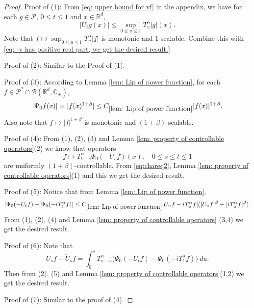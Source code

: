 \documentclass[12pt,oneside,english]{amsart}
\theoremstyle{plain}
\theoremstyle{definition}
\numberwithin{equation}{section}
\begin{document}
\begin{proof}
    Proof of (1): From \eqref{eq: upper bound for vf} in the appendix, we have for each $g\in \mathcal P$, $0\leq t\leq 1$ and $x\in \mathbb R^d$,
\[
    |U_t g(x)|
    \leq \sup_{0\leq u\leq 1}T_u^\alpha |g| (x).
\]
    Note that $f\mapsto\sup_{0\leq u\leq 1}T^{\alpha}_u|f|$ is monotonic and $1$-scalable.
    Combine this with \eqref{eq: -v has positive real part, we get the desired result.}

    Proof of (2): Similar to the Proof of (1).

    Proof of (3): According to Lemma \ref{lem: Lip of power function}, for each $f\in \mathcal P^* \cap \mathcal B(\mathbb R^d, \mathbb C_+)$,
\[
    |\Psi_0 f(x)| = |f(x)^{1+\beta}| \leq C_{\ref{lem: Lip of power function}} |f(x)|^{1+\beta}.
\]
    Also note that $f\mapsto |f|^{1+\beta}$ is monotonic and $(1+\beta)$-scalable.

    Proof of (4): From (1), (2), (3) and Lemma \ref{lem: property of controllable operators}(2) we know that operators
\[
    f
    \mapsto T^{\alpha}_{t-s}\Psi_0(-U_sf)(x),
    \quad 0\leq s\leq t\leq 1
\]
    are uniformly $(1+\beta)$-controllable.
    From \eqref{eq:chareq2}, Lemma \ref{lem: property of controllable operators}(1) and this we get the desired result.

    Proof of (5): Notice that from Lemma \ref{lem: Lip of power function},
\[
    |\Psi_0(-U_t f) - \Psi_0(-iT_t^\alpha f) |
    \leq  C_{\ref{lem: Lip of power function}} |U_u f-iT_u^{\alpha}f|(|U_u f|^{\beta}+|i T_u^{\alpha}f|^{\beta}).
\]
    From (1), (2), (4) and Lemma \ref{lem: property of controllable operators} (3,4) we get the desired result.

    Proof of (6): Note that
\[
    U_sf - \tilde U_sf
    = \int_0^s T_{s-u}^{\alpha}\big(\Psi_0(-U_t f)-\Psi_0(-i T_t^{\alpha}f)\big)~du.
\]
    Then from (2), (5) and Lemma \ref{lem: property of controllable operators}(1,2) we get the desired result.

    Proof of (7): Similar to the proof of (4).
\end{proof}
\end{document}
